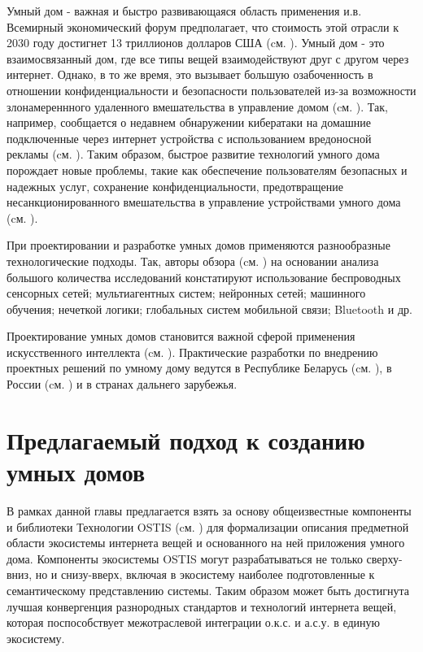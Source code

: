 Умный дом -  важная и быстро развивающаяся область применения и.в. Всемирный экономический форум предполагает, что стоимость этой отрасли к 2030 году достигнет 13 триллионов долларов США (cм. ). Умный дом - это взаимосвязанный дом, где все типы вещей взаимодействуют друг с другом через интернет. Однако, в то же время, это вызывает большую озабоченность в отношении конфиденциальности и безопасности пользователей из-за возможности злонамереннного удаленного вмешательства в управление домом (cм. ). Так, например, сообщается о недавнем обнаружении кибератаки на домашние подключенные через интернет устройства с использованием вредоносной рекламы  (cм. ). Таким образом, быстрое развитие технологий умного дома порождает новые проблемы, такие как обеспечение пользователям безопасных и надежных услуг, сохранение конфиденциальности, предотвращение несанкционированного вмешательства в управление устройствами умного дома (cм. ).

При проектировании и разработке умных домов применяются разнообразные технологические подходы. Так, авторы обзора (cм. ) на основании анализа большого количества исследований констатируют использование  беспроводных сенсорных сетей; мультиагентных систем; нейронных сетей; машинного обучения; нечеткой логики; глобальных систем мобильной связи; Bluetooth и др.

Проектирование умных домов становится важной сферой применения искусственного интеллекта (cм. ). Практические разработки по внедрению проектных решений по умному дому ведутся в Республике Беларусь (cм. ), в России (cм. ) и в странах дальнего зарубежья.

\section{Предлагаемый подход к созданию умных домов}
\label{sec_proposed_approach_SH}

В рамках данной главы предлагается взять за основу общеизвестные компоненты и библиотеки Технологии OSTIS (cм. ) для формализации описания предметной области экосистемы интернета вещей и основанного на ней приложения умного дома. Компоненты экосистемы OSTIS могут разрабатываться не только сверху-вниз, но и снизу-вверх, включая в экосистему наиболее подготовленные к семантическому представлению системы. Таким образом может быть достигнута лучшая конвергенция разнородных стандартов и технологий интернета вещей, которая поспособствует межотраслевой интеграции о.к.с. и а.с.у. в единую экосистему.

